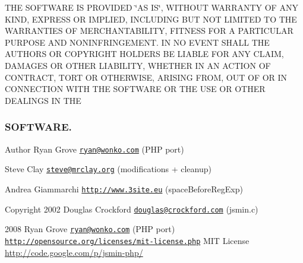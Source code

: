 T\+H\+E S\+O\+F\+T\+W\+A\+R\+E I\+S P\+R\+O\+V\+I\+D\+E\+D \char`\"{}\+A\+S I\+S\char`\"{}, W\+I\+T\+H\+O\+U\+T W\+A\+R\+R\+A\+N\+T\+Y O\+F A\+N\+Y K\+I\+N\+D, E\+X\+P\+R\+E\+S\+S O\+R I\+M\+P\+L\+I\+E\+D, I\+N\+C\+L\+U\+D\+I\+N\+G B\+U\+T N\+O\+T L\+I\+M\+I\+T\+E\+D T\+O T\+H\+E W\+A\+R\+R\+A\+N\+T\+I\+E\+S O\+F M\+E\+R\+C\+H\+A\+N\+T\+A\+B\+I\+L\+I\+T\+Y, F\+I\+T\+N\+E\+S\+S F\+O\+R A P\+A\+R\+T\+I\+C\+U\+L\+A\+R P\+U\+R\+P\+O\+S\+E A\+N\+D N\+O\+N\+I\+N\+F\+R\+I\+N\+G\+E\+M\+E\+N\+T. I\+N N\+O E\+V\+E\+N\+T S\+H\+A\+L\+L T\+H\+E A\+U\+T\+H\+O\+R\+S O\+R C\+O\+P\+Y\+R\+I\+G\+H\+T H\+O\+L\+D\+E\+R\+S B\+E L\+I\+A\+B\+L\+E F\+O\+R A\+N\+Y C\+L\+A\+I\+M, D\+A\+M\+A\+G\+E\+S O\+R O\+T\+H\+E\+R L\+I\+A\+B\+I\+L\+I\+T\+Y, W\+H\+E\+T\+H\+E\+R I\+N A\+N A\+C\+T\+I\+O\+N O\+F C\+O\+N\+T\+R\+A\+C\+T, T\+O\+R\+T O\+R O\+T\+H\+E\+R\+W\+I\+S\+E, A\+R\+I\+S\+I\+N\+G F\+R\+O\+M, O\+U\+T O\+F O\+R I\+N C\+O\+N\+N\+E\+C\+T\+I\+O\+N W\+I\+T\+H T\+H\+E S\+O\+F\+T\+W\+A\+R\+E O\+R T\+H\+E U\+S\+E O\+R O\+T\+H\+E\+R D\+E\+A\+L\+I\+N\+G\+S I\+N T\+H\+E \subsubsection*{S\+O\+F\+T\+W\+A\+R\+E. }

\begin{DoxyAuthor}{Author}
Ryan Grove \href{mailto:ryan@wonko.com}{\tt ryan@wonko.\+com} (P\+H\+P port) 

Steve Clay \href{mailto:steve@mrclay.org}{\tt steve@mrclay.\+org} (modifications + cleanup) 

Andrea Giammarchi \href{http://www.3site.eu}{\tt http\+://www.\+3site.\+eu} (space\+Before\+Reg\+Exp) 
\end{DoxyAuthor}
\begin{DoxyCopyright}{Copyright}
2002 Douglas Crockford \href{mailto:douglas@crockford.com}{\tt douglas@crockford.\+com} (jsmin.\+c) 

2008 Ryan Grove \href{mailto:ryan@wonko.com}{\tt ryan@wonko.\+com} (P\+H\+P port)  \href{http://opensource.org/licenses/mit-license.php}{\tt http\+://opensource.\+org/licenses/mit-\/license.\+php} M\+I\+T License \hyperlink{}{http\+://code.\+google.\+com/p/jsmin-\/php/}
\end{DoxyCopyright}
